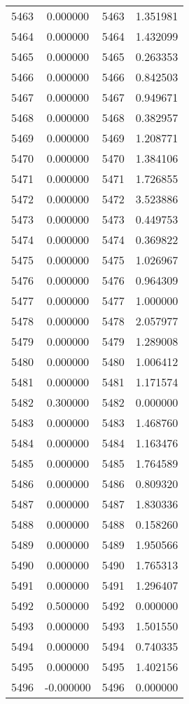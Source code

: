 \documentclass[12pt]{article}
\begin{document}
\begin{longtable}{@{}cccc@{}}
5463 & 0.000000 & 5463 & 1.351981 \\
5464 & 0.000000 & 5464 & 1.432099 \\
5465 & 0.000000 & 5465 & 0.263353 \\
5466 & 0.000000 & 5466 & 0.842503 \\
5467 & 0.000000 & 5467 & 0.949671 \\
5468 & 0.000000 & 5468 & 0.382957 \\
5469 & 0.000000 & 5469 & 1.208771 \\
5470 & 0.000000 & 5470 & 1.384106 \\
5471 & 0.000000 & 5471 & 1.726855 \\
5472 & 0.000000 & 5472 & 3.523886 \\
5473 & 0.000000 & 5473 & 0.449753 \\
5474 & 0.000000 & 5474 & 0.369822 \\
5475 & 0.000000 & 5475 & 1.026967 \\
5476 & 0.000000 & 5476 & 0.964309 \\
5477 & 0.000000 & 5477 & 1.000000 \\
5478 & 0.000000 & 5478 & 2.057977 \\
5479 & 0.000000 & 5479 & 1.289008 \\
5480 & 0.000000 & 5480 & 1.006412 \\
5481 & 0.000000 & 5481 & 1.171574 \\
5482 & 0.300000 & 5482 & 0.000000 \\
5483 & 0.000000 & 5483 & 1.468760 \\
5484 & 0.000000 & 5484 & 1.163476 \\
5485 & 0.000000 & 5485 & 1.764589 \\
5486 & 0.000000 & 5486 & 0.809320 \\
5487 & 0.000000 & 5487 & 1.830336 \\
5488 & 0.000000 & 5488 & 0.158260 \\
5489 & 0.000000 & 5489 & 1.950566 \\
5490 & 0.000000 & 5490 & 1.765313 \\
5491 & 0.000000 & 5491 & 1.296407 \\
5492 & 0.500000 & 5492 & 0.000000 \\
5493 & 0.000000 & 5493 & 1.501550 \\
5494 & 0.000000 & 5494 & 0.740335 \\
5495 & 0.000000 & 5495 & 1.402156 \\
5496 & -0.000000 & 5496 & 0.000000 \\

\end{longtable}
\end{document}

